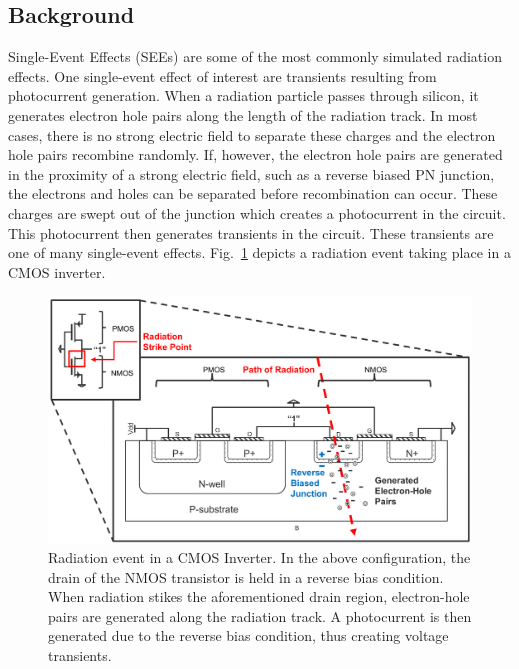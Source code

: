 \documentclass[conference]{IEEEtran}
\begin{document}
    \subsection{Background}\label{subsec:background}
    
   	Single-Event Effects (SEEs) are some of the most commonly simulated radiation effects. One single-event effect of interest are transients resulting from photocurrent generation. When a radiation particle passes through silicon, it generates electron hole pairs along the length of the radiation track. In most cases, there is no strong electric field to separate these charges and the electron hole pairs recombine randomly. If, however, the electron hole pairs are generated in the proximity of a strong electric field, such as a reverse biased PN junction, the electrons and holes can be separated before recombination can occur. These charges are swept out of the junction which creates a photocurrent in the circuit. This photocurrent then generates transients in the circuit. These transients are one of many single-event effects. Fig.~\ref{fig:cmos_inverter} depicts a radiation event taking place in a CMOS inverter.
    
    \begin{figure}[htbp]
        \centering
        \includegraphics[width=1\linewidth]{Inverter_Image_B_W_cropped}
        \caption{Radiation event in a CMOS Inverter. In the above configuration, the drain of the NMOS transistor is held in a reverse bias condition. When radiation stikes the aforementioned drain region, electron-hole pairs are generated along the radiation track. A photocurrent is then generated due to the reverse bias condition, thus creating voltage transients.}
        \label{fig:cmos_inverter}
    \end{figure}
    
\end{document}
